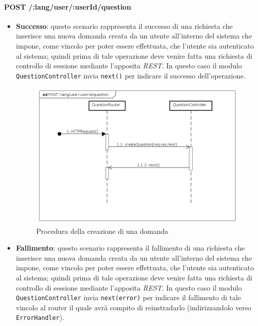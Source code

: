 \paragraph{POST /:lang/user/:userId/question}
\begin{itemize}
\item \textbf{Successo}: questo scenario rappresenta il successo di una richiesta che inserisce una nuova domanda creata da un utente all'interno del sistema che impone, come vincolo per poter essere effettuata, che l'utente sia autenticato al sistema; quindi prima di tale operazione deve venire fatta una richiesta di controllo di sessione mediante l'apposita \textit{REST}. In questo caso il modulo \texttt{QuestionController} invia \texttt{next()} per indicare il successo dell'operazione.


\begin{figure}[ht]
	\centering
	\includegraphics[scale=0.45]{UML/DiagrammiDiSequenza/Back-end/POST__lang_user__userId_question_success.png}
	\caption{Procedura della creazione di una domanda}
\end{figure}
\FloatBarrier

\item \textbf{Fallimento}: questo scenario rappresenta il fallimento di una richiesta che inserisce una nuova domanda creata da un utente all'interno del sistema che impone, come vincolo per poter essere effettuata, che l'utente sia autenticato al sistema; quindi prima di tale operazione deve venire fatta una richiesta di controllo di sessione mediante l'apposita \textit{REST}. In questo caso il modulo \texttt{QuestionController} invia \texttt{next(error)} per indicare il fallimento di tale vincolo al router il quale avrà compito di reinstradarlo (indirizzandolo verso \texttt{ErrorHandler}).


\end{itemize}
